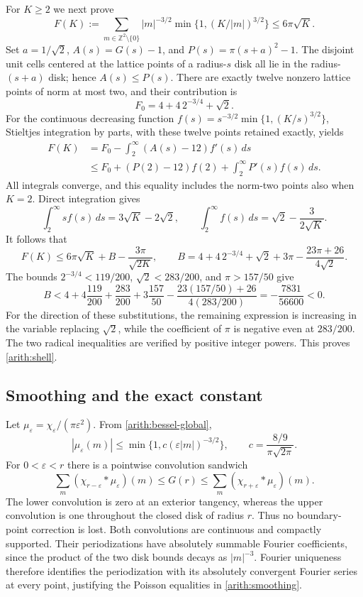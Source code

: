 \documentclass[11pt,reqno]{amsart}
\numberwithin{equation}{section}
\begin{document}
For $K\ge2$ we next prove
\begin{equation}\label{arith:shell}
 F(K):=\sum_{m\in\mathbb Z^2\setminus\{0\}}
 |m|^{-3/2}\min\{1,(K/|m|)^{3/2}\}\le6\pi\sqrt K.
\end{equation}
Set $a=1/\sqrt2$, $A(s)=G(s)-1$, and $P(s)=\pi(s+a)^2-1$.
The disjoint unit cells centered at the lattice points of a radius-$s$
disk all lie in the radius-$(s+a)$ disk; hence $A(s)\le P(s)$.
There are exactly twelve nonzero lattice points of norm at most two,
and their contribution is
\[
 F_0=4+4\,2^{-3/4}+\sqrt2.
\]
For the continuous decreasing function
$f(s)=s^{-3/2}\min\{1,(K/s)^{3/2}\}$, Stieltjes integration by
parts, with these twelve points retained exactly, yields
\begin{align*}
 F(K)&=F_0-\int_2^\infty(A(s)-12)f'(s)\,ds\\
 &\le F_0+(P(2)-12)f(2)+\int_2^\infty P'(s)f(s)\,ds.
\end{align*}
All integrals converge, and this equality includes the norm-two points
also when $K=2$.  Direct integration gives
\[
 \int_2^\infty s f(s)\,ds=3\sqrt K-2\sqrt2,
 \qquad
 \int_2^\infty f(s)\,ds=\sqrt2-\frac3{2\sqrt K}.
\]
It follows that
\[
 F(K)\le6\pi\sqrt K+B-\frac{3\pi}{\sqrt{2K}},\qquad
 B=4+4\,2^{-3/4}+\sqrt2+3\pi-
                 \frac{23\pi+26}{4\sqrt2}.
\]
The bounds $2^{-3/4}<119/200$, $\sqrt2<283/200$, and $\pi>157/50$
give
\[
 B<4+4\frac{119}{200}+\frac{283}{200}+3\frac{157}{50}
       -\frac{23(157/50)+26}{4(283/200)}
   =-\frac{7831}{56600}<0.
\]
For the direction of these substitutions, the remaining expression is
increasing in the variable replacing $\sqrt2$, while the coefficient of
$\pi$ is negative even at $283/200$.  The two radical inequalities
are verified by positive integer powers.  This proves \eqref{arith:shell}.

\subsection{Smoothing and the exact constant}

Let $\mu_\varepsilon=\chi_\varepsilon/(\pi\varepsilon^2)$.  From
\eqref{arith:bessel-global},
\[
 |\widehat\mu_\varepsilon(m)|\le
 \min\{1,c(\varepsilon|m|)^{-3/2}\},
 \qquad c=\frac{8/9}{\pi\sqrt{2\pi}}.
\]
For $0<\varepsilon<r$ there is a pointwise convolution sandwich
\begin{equation}\label{arith:smoothing}
 \sum_m(\chi_{r-\varepsilon}*\mu_\varepsilon)(m)
 \le G(r)\le
 \sum_m(\chi_{r+\varepsilon}*\mu_\varepsilon)(m).
\end{equation}
The lower convolution is zero at an exterior tangency, whereas the
upper convolution is one throughout the closed disk of radius $r$.
Thus no boundary-point correction is lost.  Both convolutions are
continuous and compactly supported.  Their periodizations have
absolutely summable Fourier coefficients, since the product of the
two disk bounds decays as $|m|^{-3}$.  Fourier uniqueness therefore
identifies the periodization with its absolutely convergent Fourier
series at every point, justifying the Poisson equalities in
\eqref{arith:smoothing}.
\end{document}
